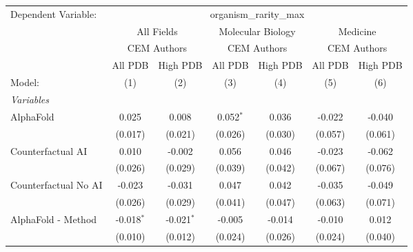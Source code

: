\begingroup
\centering
\begin{tabular}{lcccccc}
   \tabularnewline \midrule \midrule
   Dependent Variable: & \multicolumn{6}{c}{organism\_rarity\_max}\\
 & \multicolumn{2}{c}{All Fields} & \multicolumn{2}{c}{Molecular Biology} & \multicolumn{2}{c}{Medicine} \\
\cmidrule(lr){2-3} \cmidrule(lr){4-5} \cmidrule(lr){6-7}
 & \multicolumn{2}{c}{CEM Authors} & \multicolumn{2}{c}{CEM Authors} & \multicolumn{2}{c}{CEM Authors} \\
\cmidrule(lr){2-3} \cmidrule(lr){4-5} \cmidrule(lr){6-7}
 & \multicolumn{1}{c}{All PDB} & \multicolumn{1}{c}{High PDB} & \multicolumn{1}{c}{All PDB} & \multicolumn{1}{c}{High PDB} & \multicolumn{1}{c}{All PDB} & \multicolumn{1}{c}{High PDB} \\
\cmidrule(lr){2-2} \cmidrule(lr){3-3} \cmidrule(lr){4-4} \cmidrule(lr){5-5} \cmidrule(lr){6-6} \cmidrule(lr){7-7}
   Model:                                                     & (1)          & (2)          & (3)          & (4)          & (5)     & (6)\\  
   \midrule
   \emph{Variables}\\
   AlphaFold                                                  & 0.025        & 0.008        & 0.052$^{*}$  & 0.036        & -0.022  & -0.040\\   
                                                              & (0.017)      & (0.021)      & (0.026)      & (0.030)      & (0.057) & (0.061)\\   
   Counterfactual AI                                          & 0.010        & -0.002       & 0.056        & 0.046        & -0.023  & -0.062\\   
                                                              & (0.026)      & (0.029)      & (0.039)      & (0.042)      & (0.067) & (0.076)\\   
   Counterfactual No AI                                       & -0.023       & -0.031       & 0.047        & 0.042        & -0.035  & -0.049\\   
                                                              & (0.026)      & (0.029)      & (0.041)      & (0.047)      & (0.063) & (0.071)\\   
   AlphaFold - Method                                         & -0.018$^{*}$ & -0.021$^{*}$ & -0.005       & -0.014       & -0.010  & 0.012\\   
                                                              & (0.010)      & (0.012)      & (0.024)      & (0.026)      & (0.024) & (0.040)\\   

\end{tabular}
